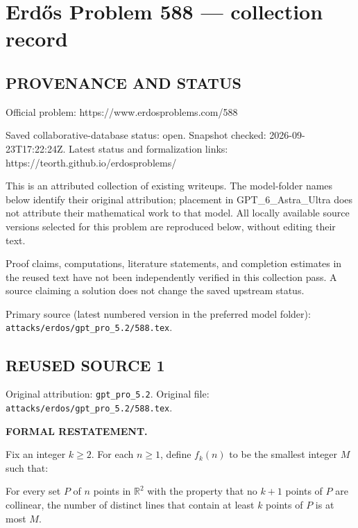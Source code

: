 \section*{Erd\H{o}s Problem 588 --- collection record}

\subsection*{PROVENANCE AND STATUS}
Official problem: https://www.erdosproblems.com/588

Saved collaborative-database status: open.
Snapshot checked: 2026-09-23T17:22:24Z.
Latest status and formalization links: https://teorth.github.io/erdosproblems/

This is an attributed collection of existing writeups. The model-folder names below identify their original attribution; placement in GPT\_6\_Astra\_Ultra does not attribute their mathematical work to that model. All locally available source versions selected for this problem are reproduced below, without editing their text.

Proof claims, computations, literature statements, and completion estimates in the reused text have not been independently verified in this collection pass. A source claiming a solution does not change the saved upstream status.

Primary source (latest numbered version in the preferred model folder): \texttt{attacks/erdos/gpt\_pro\_5.2/588.tex}.

\subsection*{REUSED SOURCE 1}
Original attribution: \texttt{gpt\_pro\_5.2}.
Original file: \texttt{attacks/erdos/gpt\_pro\_5.2/588.tex}.


\noindent\textbf{FORMAL RESTATEMENT.}

Fix an integer $k\ge 2$.
For each $n\ge 1$, define $f_k(n)$ to be the smallest integer $M$ such that:

For every set $P$ of $n$ points in $\mathbb{R}^2$ with the property that no $k+1$ points of $P$ are collinear, the number of distinct lines that contain at least $k$ points of $P$ is at most $M$.


